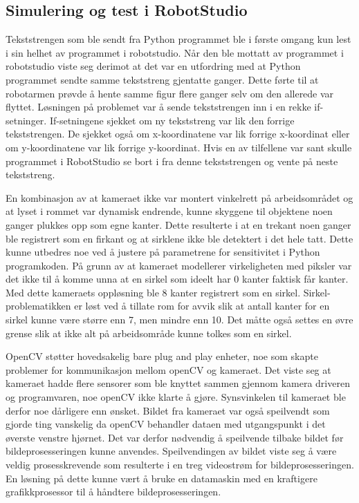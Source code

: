 \documentclass[conference]{IEEEtran}
\begin{document}
    \subsection{Simulering og test i RobotStudio}
        Tekststrengen som ble sendt fra Python programmet ble i første omgang kun lest i sin helhet av programmet i robotstudio. Når den ble mottatt av programmet i robotstudio viste seg derimot at det var en utfordring med at Python programmet sendte samme tekststreng gjentatte ganger. Dette førte til at robotarmen prøvde å hente samme figur flere ganger selv om den allerede var flyttet. Løsningen på problemet var å sende tekststrengen inn i en rekke if-setninger. If-setningene sjekket om ny tekststreng var lik den forrige tekststrengen. De sjekket også om x-koordinatene var lik forrige x-koordinat eller om y-koordinatene var lik forrige y-koordinat. Hvis en av tilfellene var sant skulle programmet i RobotStudio se bort i fra denne tekststrengen og vente på neste tekststreng.

        En kombinasjon av at kameraet ikke var montert vinkelrett på arbeidsområdet og at lyset i rommet var dynamisk endrende, kunne skyggene til objektene noen ganger plukkes opp som egne kanter. Dette resulterte i at en trekant noen ganger ble registrert som en firkant og at sirklene ikke ble detektert i det hele tatt. Dette kunne utbedres noe ved å justere på parametrene for sensitivitet i Python programkoden. På grunn av at kameraet modellerer virkeligheten med piksler var det ikke til å komme unna at en sirkel som ideelt har 0 kanter faktisk får kanter. Med dette kameraets oppløsning ble 8 kanter registrert som en sirkel. Sirkel-problematikken er løst ved å tillate rom for avvik slik at antall kanter for en sirkel kunne være større enn 7, men mindre enn 10. Det måtte også settes en øvre grense slik at ikke alt på arbeidsområde kunne tolkes som en sirkel. 

        OpenCV støtter hovedsakelig bare plug and play enheter, noe som skapte problemer for kommunikasjon mellom openCV og kameraet. Det viste seg at kameraet hadde flere sensorer som ble knyttet sammen gjennom kamera driveren og programvaren, noe openCV ikke klarte å gjøre. Synsvinkelen til kameraet ble derfor noe dårligere enn ønsket. Bildet fra kameraet var også speilvendt som gjorde ting vanskelig da openCV behandler dataen med utgangspunkt i det øverste venstre hjørnet. Det var derfor nødvendig å speilvende tilbake bildet før bildeprosesseringen kunne anvendes. 
        Speilvendingen av bildet viste seg å være veldig prosesskrevende som resulterte i en treg videostrøm for bildeprosesseringen. En løsning på dette kunne vært å bruke en datamaskin med en kraftigere grafikkprosessor til å håndtere bildeprosesseringen. 
\end{document}
